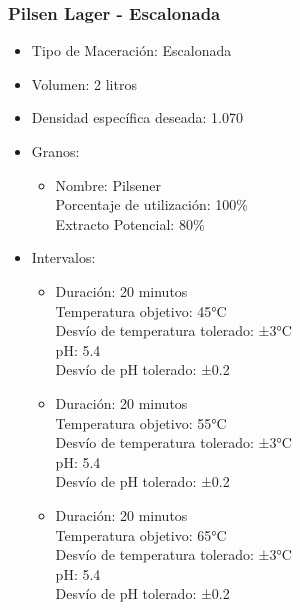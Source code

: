                 \begin{minipage}{0.95\textwidth}
                \subsubsection{Pilsen Lager - Escalonada} 
                \begin{itemize}
                    \item Tipo de Maceración: Escalonada
                    \item Volumen: 2 litros
                    \item Densidad específica deseada: 1.070
                    
                    \item Granos:
                        \begin{itemize}
                            \item Nombre: Pilsener \\
                                Porcentaje de utilización: 100\% \\
                                Extracto Potencial: 80\%
                        \end{itemize}
                    \item Intervalos:
                        \begin{itemize}
                            \item Duración: 20 minutos \\
                             Temperatura objetivo: 45°C \\
                             Desvío de temperatura tolerado: ±3°C \\
                             pH: 5.4 \\
                             Desvío de pH tolerado: ±0.2 \\
                             \item Duración: 20 minutos \\
                             Temperatura objetivo: 55°C \\
                             Desvío de temperatura tolerado: ±3°C \\
                             pH: 5.4 \\
                             Desvío de pH tolerado: ±0.2 \\
                             \item Duración: 20 minutos \\
                             Temperatura objetivo: 65°C \\
                             Desvío de temperatura tolerado: ±3°C \\
                             pH: 5.4 \\
                             Desvío de pH tolerado: ±0.2 \\
                        \end{itemize}
                \end{itemize}
     \hfill \break
     \hfill \break

\end{minipage}
